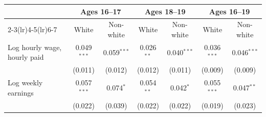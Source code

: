 \begin{tabular}{lcccccc}
\toprule
 & \multicolumn{2}{c}{Ages 16--17} & \multicolumn{2}{c}{Ages 18--19} & \multicolumn{2}{c}{Ages 16--19} \\
\cmidrule(lr){2-3}\cmidrule(lr){4-5}\cmidrule(lr){6-7}
 & White & Non-white & White & Non-white & White & Non-white \\
\midrule
Log hourly wage, hourly paid & 0.049$^{***}$ & 0.059$^{***}$ & 0.026$^{**}$ & 0.040$^{***}$ & 0.036$^{***}$ & 0.046$^{***}$ \\
 & (0.011) & (0.012) & (0.012) & (0.011) & (0.009) & (0.009) \\
Log weekly earnings & 0.057$^{***}$ & 0.074$^{*}$ & 0.054$^{**}$ & 0.042$^{*}$ & 0.055$^{***}$ & 0.047$^{**}$ \\
 & (0.022) & (0.039) & (0.022) & (0.022) & (0.019) & (0.023) \\
\bottomrule
\end{tabular}
